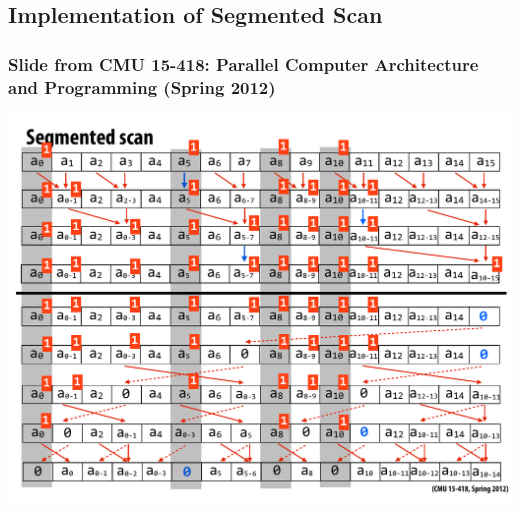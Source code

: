 \documentclass{beamer}
\begin{document}

\subsection{Implementation of Segmented Scan}

\begin{frame}[fragile]
	\tableofcontents[currentsubsection]
\end{frame}

\begin{frame}[fragile,t]
  \frametitle{{\scriptsize Slide from CMU 15-418: Parallel Computer Architecture and Programming (Spring 2012)}}
\vspace{-3ex}
\begin{center}
\includegraphics[height=50ex]{Figures/L2/SegmExclScan} 
\end  {center}

\end{frame}
\end{document}
